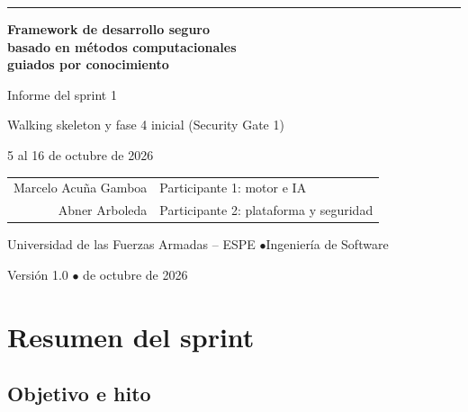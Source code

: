 \documentclass[11pt,a4paper]{report}
\begin{document}
\begin{titlepage}
\centering
\vspace*{4.2cm}
{\color{azulfw}\rule{\textwidth}{0.8pt}}\par\vspace{0.9cm}
{\fontsize{24}{30}\selectfont\bfseries Framework de desarrollo seguro\\
basado en métodos computacionales\\ guiados por conocimiento\par}
\vspace{0.9cm}{\color{azulfw}\rule{\textwidth}{0.8pt}}\par
\vspace{1.1cm}
{\Large Informe del sprint 1\par}
\vspace{0.3cm}
{\large Walking skeleton y fase 4 inicial (Security Gate 1)\par}
\vspace{0.3cm}
{\normalsize 5 al 16 de octubre de 2026\par}
\vspace{2.2cm}
{\normalsize
\begin{tabular}{rl}
Marcelo Acuña Gamboa & Participante 1: motor e IA\\
Abner Arboleda & Participante 2: plataforma y seguridad\\
\end{tabular}\par}
\vfill
{\normalsize Universidad de las Fuerzas Armadas – ESPE \quad$\bullet$\quad Ingeniería de Software\par}
\vspace{0.4cm}
{\normalsize Versión 1.0 \quad$\bullet$ de octubre de 2026\par}
\end{titlepage}

\tableofcontents

\chapter{Resumen del sprint}

\section{Objetivo e hito}
\end{document}
